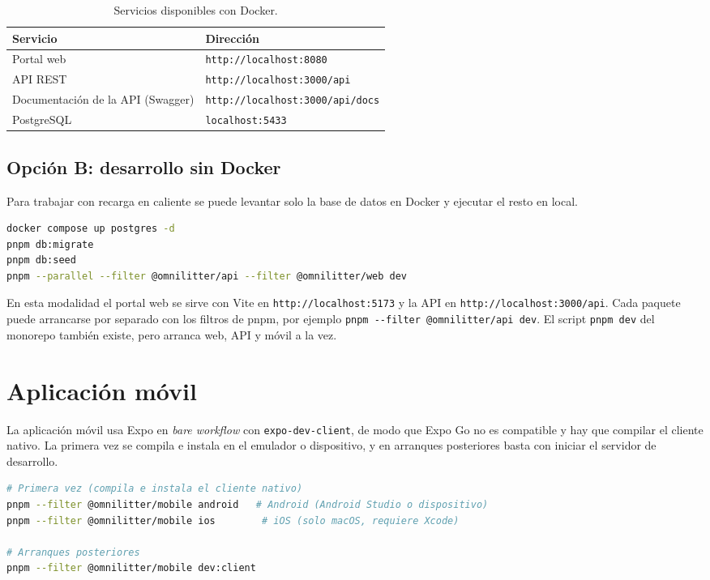 \begin{table}[H]
\centering
\caption{Servicios disponibles con Docker.}
\label{tab:urls_docker}
\small
\begin{tabularx}{\textwidth}{p{4.5cm} X}
\toprule
\textbf{Servicio} & \textbf{Dirección} \\
\midrule
Portal web & \texttt{http://localhost:8080} \\
API REST & \texttt{http://localhost:3000/api} \\
Documentación de la API (Swagger) & \texttt{http://localhost:3000/api/docs} \\
PostgreSQL & \texttt{localhost:5433} \\
\bottomrule
\end{tabularx}
\end{table}

\subsection{Opción B: desarrollo sin Docker}

Para trabajar con recarga en caliente se puede levantar solo la base de datos en Docker
y ejecutar el resto en local.

\begin{lstlisting}[language=bash]
docker compose up postgres -d
pnpm db:migrate
pnpm db:seed
pnpm --parallel --filter @omnilitter/api --filter @omnilitter/web dev
\end{lstlisting}

En esta modalidad el portal web se sirve con Vite en \texttt{http://localhost:5173} y la
API en \texttt{http://localhost:3000/api}. Cada paquete puede arrancarse por separado
con los filtros de pnpm, por ejemplo \texttt{pnpm -{}-filter @omnilitter/api dev}. El
script \texttt{pnpm dev} del monorepo también existe, pero arranca web, API y móvil a la
vez.

\section{Aplicación móvil}

La aplicación móvil usa Expo en \textit{bare workflow} con \texttt{expo-dev-client}, de
modo que Expo Go no es compatible y hay que compilar el cliente nativo. La primera vez
se compila e instala en el emulador o dispositivo, y en arranques posteriores basta con
iniciar el servidor de desarrollo.

\begin{lstlisting}[language=bash]
# Primera vez (compila e instala el cliente nativo)
pnpm --filter @omnilitter/mobile android   # Android (Android Studio o dispositivo)
pnpm --filter @omnilitter/mobile ios        # iOS (solo macOS, requiere Xcode)

# Arranques posteriores
pnpm --filter @omnilitter/mobile dev:client
\end{lstlisting}

